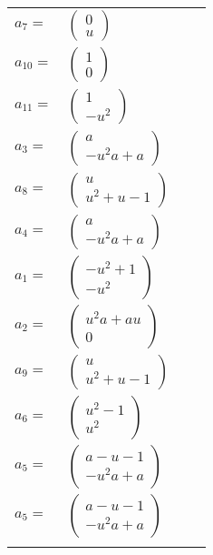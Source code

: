 \documentclass[1p]{elsarticle_modified}
\theoremstyle{definition}
\begin{document}
\begin{tabular}{m{7pt} m{180pt} m{7pt} m{180pt} }
\flushright $a_{7}=$&$\begin{pmatrix}0\\u\end{pmatrix}$ \\
\flushright $a_{10}=$&$\begin{pmatrix}1\\0\end{pmatrix}$ \\
\flushright $a_{11}=$&$\begin{pmatrix}1\\- u^2\end{pmatrix}$ \\
\flushright $a_{3}=$&$\begin{pmatrix}a\\- u^2 a+a\end{pmatrix}$ \\
\flushright $a_{8}=$&$\begin{pmatrix}u\\u^2+u-1\end{pmatrix}$ \\
\flushright $a_{4}=$&$\begin{pmatrix}a\\- u^2 a+a\end{pmatrix}$ \\
\flushright $a_{1}=$&$\begin{pmatrix}- u^2+1\\- u^2\end{pmatrix}$ \\
\flushright $a_{2}=$&$\begin{pmatrix}u^2 a+a u\\0\end{pmatrix}$ \\
\flushright $a_{9}=$&$\begin{pmatrix}u\\u^2+u-1\end{pmatrix}$ \\
\flushright $a_{6}=$&$\begin{pmatrix}u^2-1\\u^2\end{pmatrix}$ \\
\flushright $a_{5}=$&$\begin{pmatrix}a- u-1\\- u^2 a+a\end{pmatrix}$\\ \flushright $a_{5}=$&$\begin{pmatrix}a- u-1\\- u^2 a+a\end{pmatrix}$\\&\end{tabular}
\end{document}
